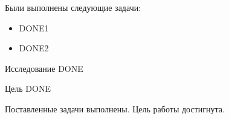 
Были выполнены следующие задачи:
\begin{itemize}
	\item DONE1
	\item DONE2
\end{itemize}

Исследование DONE

Цель DONE

Поставленные задачи выполнены. Цель работы достигнута.